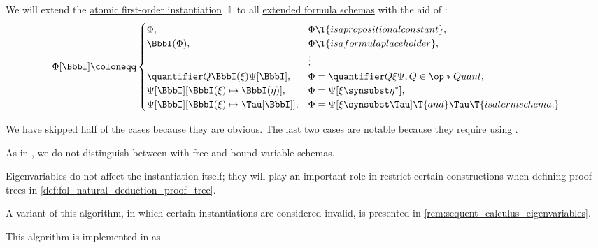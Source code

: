 \begin{algorithm}\label{alg:fol_formula_schema_instantiation}
  We will extend the \hyperref[def:atomic_fol_instantiation]{atomic first-order instantiation} \( \BbbI \) to all \hyperref[def:fol_formula_schema]{extended formula schemas} with the aid of :
  \begin{equation}\label{eq:alg:fol_formula_schema_instantiation}
    \Phi[\BbbI] \coloneqq \begin{cases}
      \Phi,                                        &\Phi \T{is a propositional constant},             \\
      \BbbI(\Phi),                                 &\Phi \T{is a formula placeholder},                \\
                                                   &\vdots                                            \\
      \quantifier Q {\BbbI(\xi)} \Psi[\BbbI],      &\Phi = \quantifier Q \xi \Psi, Q \in \op*{Quant}, \\
      \Psi[\BbbI][\BbbI(\xi) \mapsto \BbbI(\eta)], &\Phi = \Psi[\xi \synsubst \eta^\ast],             \\
      \Psi[\BbbI][\BbbI(\xi) \mapsto \Tau[\BbbI]], &\Phi = \Psi[\xi \synsubst \Tau] \T{and} \Tau \T{is a term schema.}
    \end{cases}
  \end{equation}

  We have skipped half of the cases because they are obvious. The last two cases are notable because they require using .
\end{algorithm}
\begin{comments}
  \item As in , we do not distinguish between with free and bound variable schemas.

  \item Eigenvariables do not affect the instantiation itself; they will play an important role in restrict certain constructions when defining proof trees in \cref{def:fol_natural_deduction_proof_tree}.

  \item A variant of this algorithm, in which certain instantiations are considered invalid, is presented in \cref{rem:sequent_calculus_eigenvariables}.

  \item This algorithm is implemented in \cite{notebook:code} as
  \begin{CodeRefDisplay}
  \end{CodeRefDisplay}
\end{comments}

